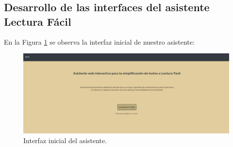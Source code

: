  



 


 
%	
%	
%	
\subsection{Desarrollo de las interfaces del asistente Lectura Fácil}

En la Figura \ref{fig:interfazInicial} se observa la interfaz inicial de nuestro asistente: 
\begin{figure}[h!]
	\centering
	
	
	\includegraphics[scale=0.4]{Imagenes/Figuras/InterfazInicial}


\caption{Interfaz inicial del asistente.}
\label{fig:interfazInicial}
\end{figure}


